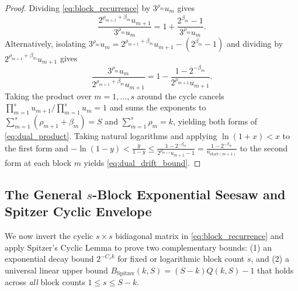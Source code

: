 \documentclass[11pt, a4paper]{amsart}
\theoremstyle{definition}
\begin{document}
\begin{proof}
Dividing \eqref{eq:block_recurrence} by $3^{\rho_m} u_m$ gives
\[
\frac{2^{\rho_{m+1} + \beta_m} u_{m+1}}{3^{\rho_m} u_m} = 1 + \frac{2^{\beta_m} - 1}{3^{\rho_m} u_m}.
\]
Alternatively, isolating $3^{\rho_m} u_m = 2^{\rho_{m+1} + \beta_m} u_{m+1} - (2^{\beta_m} - 1)$ and dividing by $2^{\rho_{m+1} + \beta_m} u_{m+1}$ gives
\[
\frac{3^{\rho_m} u_m}{2^{\rho_{m+1} + \beta_m} u_{m+1}} = 1 - \frac{1 - 2^{-\beta_m}}{2^{\rho_{m+1}} u_{m+1}}.
\]
Taking the product over $m = 1, \dots, s$ around the cycle cancels $\prod_{m=1}^s u_{m+1} / \prod_{m=1}^s u_m = 1$ and sums the exponents to $\sum_{m=1}^s (\rho_{m+1} + \beta_m) = S$ and $\sum_{m=1}^s \rho_m = k$, yielding both forms of \eqref{eq:dual_product}. Taking natural logarithms and applying $\ln(1 + x) < x$ to the first form and $-\ln(1 - y) < \frac{y}{1 - y} \le \frac{1 - 2^{-\beta_m}}{2^{\rho_{m+1}} u_{m+1} - 1} = \frac{1 - 2^{-\beta_m}}{n_{\text{start}(m+1)}}$ to the second form at each block $m$ yields \eqref{eq:dual_drift_bound}.
\end{proof}

\subsection{The General $s$-Block Exponential Seesaw and Spitzer Cyclic Envelope}

We now invert the cyclic $s \times s$ bidiagonal matrix in \eqref{eq:block_recurrence} and apply Spitzer's Cyclic Lemma to prove two complementary bounds: (1) an exponential decay bound $2^{-C_s k}$ for fixed or logarithmic block count $s$, and (2) a universal linear upper bound $B_{\text{Spitzer}}(k, S) = (S - k) Q(k, S) - 1$ that holds across \emph{all} block counts $1 \le s \le S - k$.
\end{document}
